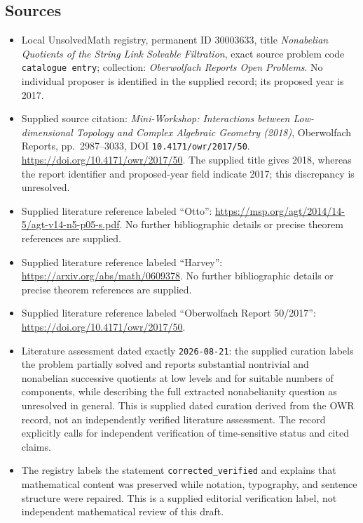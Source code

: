 \documentclass[11pt]{article}
\begin{document}
\subsection{Sources}
\begin{itemize}
\item Local UnsolvedMath registry, permanent ID \(30003633\), title \emph{Nonabelian Quotients of the String Link Solvable Filtration}, exact source problem code \texttt{catalogue entry}; collection: \emph{Oberwolfach Reports Open Problems}. No individual proposer is identified in the supplied record; its proposed year is 2017.
\item Supplied source citation: \emph{Mini-Workshop: Interactions between Low-dimensional Topology and Complex Algebraic Geometry (2018)}, Oberwolfach Reports, pp.\ 2987--3033, DOI \texttt{10.4171/owr/2017/50}. \url{https://doi.org/10.4171/owr/2017/50}. The supplied title gives 2018, whereas the report identifier and proposed-year field indicate 2017; this discrepancy is unresolved.
\item Supplied literature reference labeled ``Otto'': \url{https://msp.org/agt/2014/14-5/agt-v14-n5-p05-s.pdf}. No further bibliographic details or precise theorem references are supplied.
\item Supplied literature reference labeled ``Harvey'': \url{https://arxiv.org/abs/math/0609378}. No further bibliographic details or precise theorem references are supplied.
\item Supplied literature reference labeled ``Oberwolfach Report 50/2017'': \url{https://doi.org/10.4171/owr/2017/50}.
\item Literature assessment dated exactly \texttt{2026-08-21}: the supplied curation labels the problem partially solved and reports substantial nontrivial and nonabelian successive quotients at low levels and for suitable numbers of components, while describing the full extracted nonabelianity question as unresolved in general. This is supplied dated curation derived from the OWR record, not an independently verified literature assessment. The record explicitly calls for independent verification of time-sensitive status and cited claims.
\item The registry labels the statement \texttt{corrected\_verified} and explains that mathematical content was preserved while notation, typography, and sentence structure were repaired. This is a supplied editorial verification label, not independent mathematical review of this draft.
\end{itemize}
\end{document}
